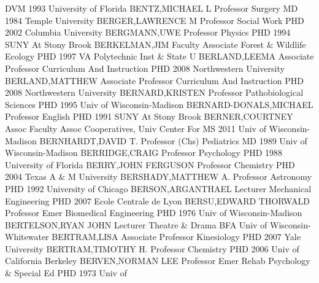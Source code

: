 \documentclass[
]{article}
\begin{document}
\textbar DVM 1993 University of Florida \textbar BENTZ,MICHAEL L
\textbar{}  \textbar Professor \textbar Surgery \textbar MD
1984 Temple University \textbar BERGER,LAWRENCE M \textbar{} 
\textbar Professor \textbar Social Work \textbar PHD 2002 Columbia
University \textbar BERGMANN,UWE \textbar{} 
\textbar Professor \textbar Physics \textbar PHD 1994 SUNY At Stony
Brook \textbar BERKELMAN,JIM \textbar{}  \textbar Faculty
Associate \textbar Forest \& Wildlife Ecology \textbar PHD 1997 VA
Polytechnic Inst \& State U \textbar BERLAND,LEEMA \textbar{}
 \textbar Associate Professor \textbar Curriculum And
Instruction \textbar PHD 2008 Northwestern University
\textbar BERLAND,MATTHEW \textbar{}  \textbar Associate
Professor \textbar Curriculum And Instruction \textbar PHD 2008
Northwestern University \textbar BERNARD,KRISTEN \textbar{} 
\textbar Professor \textbar Pathobiological Sciences \textbar PHD 1995
Univ of Wisconsin-Madison \textbar BERNARD-DONALS,MICHAEL \textbar{}
 \textbar Professor \textbar English \textbar PHD 1991 SUNY
At Stony Brook \textbar BERNER,COURTNEY \textbar{} 
\textbar Assoc Faculty Assoc \textbar Cooperatives, Univ Center For
\textbar MS 2011 Univ of Wisconsin-Madison \textbar BERNHARDT,DAVID T.
\textbar{}  \textbar Professor (Chs) \textbar Pediatrics
\textbar MD 1989 Univ of Wisconsin-Madison \textbar BERRIDGE,CRAIG
\textbar{}  \textbar Professor \textbar Psychology
\textbar PHD 1988 University of Florida \textbar BERRY,JOHN FERGUSON
\textbar{}  \textbar Professor \textbar Chemistry
\textbar PHD 2004 Texas A \& M University \textbar BERSHADY,MATTHEW A.
\textbar{}  \textbar Professor \textbar Astronomy
\textbar PHD 1992 University of Chicago \textbar BERSON,ARGANTHAEL
\textbar{}  \textbar Lecturer \textbar Mechanical Engineering
\textbar PHD 2007 Ecole Centrale de Lyon \textbar BERSU,EDWARD THORWALD
\textbar{}  \textbar Professor Emer \textbar Biomedical
Engineering \textbar PHD 1976 Univ of Wisconsin-Madison
\textbar BERTELSON,RYAN JOHN \textbar{}  \textbar Lecturer
\textbar Theatre \& Drama \textbar BFA Univ of Wisconsin-Whitewater
\textbar BERTRAM,LISA \textbar{}  \textbar Associate
Professor \textbar Kinesiology \textbar PHD 2007 Yale University
\textbar BERTRAM,TIMOTHY H. \textbar{}  \textbar Professor
\textbar Chemistry \textbar PHD 2006 Univ of California Berkeley
\textbar BERVEN,NORMAN LEE \textbar{}  \textbar Professor
Emer \textbar Rehab Psychology \& Special Ed \textbar PHD 1973 Univ of
\end{document}
